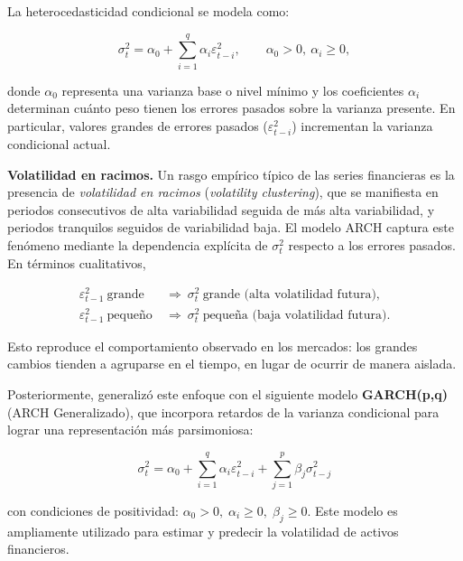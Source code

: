 \documentclass[12pt]{paper}
\begin{document}
La heterocedasticidad condicional se modela como:

\begin{equation}
    \sigma_t^2 = \alpha_0 + \sum_{i=1}^{q} \alpha_i \varepsilon_{t-i}^2,
    \qquad \alpha_0 > 0,\ \alpha_i \ge 0,
\end{equation}

donde $\alpha_0$ representa una varianza base o nivel mínimo
y los coeficientes $\alpha_i$ determinan cuánto peso tienen los errores pasados
sobre la varianza presente. En particular, valores grandes de errores pasados
($\varepsilon_{t-i}^2$) incrementan la varianza condicional actual.

\vspace{0.3cm}

\noindent\textbf{Volatilidad en racimos.}
Un rasgo empírico típico de las series financieras es la presencia de \emph{volatilidad en racimos}
(\emph{volatility clustering}), que se manifiesta en periodos consecutivos de alta variabilidad
seguida de más alta variabilidad, y periodos tranquilos seguidos de variabilidad baja.
El modelo ARCH captura este fenómeno mediante la dependencia explícita de $\sigma_t^2$
respecto a los errores pasados. En términos cualitativos,

\begin{equation}
\begin{aligned}
\varepsilon_{t-1}^2 \ \text{grande}
&\ \Rightarrow\
\sigma_t^2 \ \text{grande (alta volatilidad futura)},\\[4pt]
\varepsilon_{t-1}^2 \ \text{pequeño}
&\ \Rightarrow\
\sigma_t^2 \ \text{pequeña (baja volatilidad futura)}.
\end{aligned}
\end{equation}

Esto reproduce el comportamiento observado en los mercados: los grandes cambios tienden a agruparse en el tiempo, en lugar de ocurrir de manera aislada.

Posteriormente, \cite{bollerslev1986garch} generalizó este enfoque con el siguiente modelo \textbf{GARCH(p,q)} (ARCH Generalizado), que incorpora retardos de la varianza condicional para lograr una representación más parsimoniosa:

\begin{equation}
\sigma_t^2 = \alpha_0 + \sum_{i=1}^{q} \alpha_i \varepsilon_{t-i}^2
+ \sum_{j=1}^{p} \beta_j \sigma_{t-j}^2
\end{equation}

con condiciones de positividad: \(\alpha_0 > 0, \; \alpha_i \geq 0, \; \beta_j \geq 0\). Este modelo es ampliamente utilizado para estimar y predecir la volatilidad de activos financieros.
\end{document}
